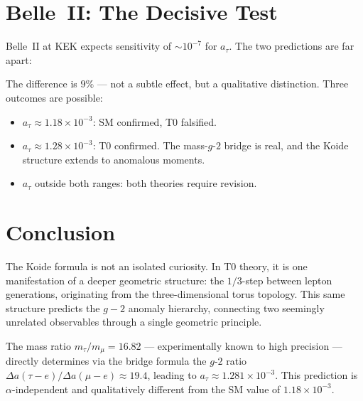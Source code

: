 \section{Belle~II: The Decisive Test}

Belle~II at KEK expects sensitivity of $\sim 10^{-7}$ for $a_\tau$. The two predictions are far apart:

\begin{table}[h]
	\centering
	\caption{Tau anomaly predictions --- Belle~II will distinguish}
\end{table}

The difference is $9\%$ --- not a subtle effect, but a qualitative distinction. Three outcomes are possible:
\begin{itemize}
	\item $a_\tau \approx 1.18 \times 10^{-3}$: SM confirmed, T0 falsified.
	\item $a_\tau \approx 1.28 \times 10^{-3}$: T0 confirmed. The mass-$g$-$2$ bridge is real, and the Koide structure extends to anomalous moments.
	\item $a_\tau$ outside both ranges: both theories require revision.
\end{itemize}

\section{Conclusion}

The Koide formula is not an isolated curiosity. In T0 theory, it is one manifestation of a deeper geometric structure: the $1/3$-step between lepton generations, originating from the three-dimensional torus topology. This same structure predicts the $g-2$ anomaly hierarchy, connecting two seemingly unrelated observables through a single geometric principle.

The mass ratio $m_\tau/m_\mu = 16.82$ --- experimentally known to high precision --- directly determines via the bridge formula the $g$-$2$ ratio $\Delta a(\tau{-}e)/\Delta a(\mu{-}e) \approx 19.4$, leading to $a_\tau \approx 1.281 \times 10^{-3}$. This prediction is $\alpha$-independent and qualitatively different from the SM value of $1.18 \times 10^{-3}$.

